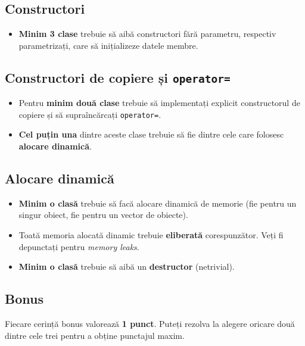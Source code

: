 \subsection*{Constructori}

\begin{itemize}
    \item \textbf{Minim 3 clase} trebuie să aibă constructori fără parametru, respectiv parametrizați, care să inițializeze datele membre.
\end{itemize}

\subsection*{Constructori de copiere și \texttt{operator=}}

\begin{itemize}
    \item Pentru \textbf{minim două clase} trebuie să implementați explicit constructorul de copiere și să supraîncărcați \texttt{operator=}.

    \item \textbf{Cel puțin una} dintre aceste clase trebuie să fie dintre cele care folosesc \textbf{alocare dinamică}.
\end{itemize}

\subsection*{Alocare dinamică}

\begin{itemize}
    \item \textbf{Minim o clasă} trebuie să facă alocare dinamică de memorie (fie pentru un singur obiect, fie pentru un vector de obiecte).

    \item Toată memoria alocată dinamic trebuie \textbf{eliberată} corespunzător. Veți fi depunctați pentru \textit{memory leaks}.

    \item \textbf{Minim o clasă} trebuie să aibă un \textbf{destructor} (netrivial).
\end{itemize}

\subsection*{Bonus}

Fiecare cerință bonus valorează \textbf{1 punct}. Puteți rezolva la alegere oricare două dintre cele trei pentru a obține punctajul maxim.

